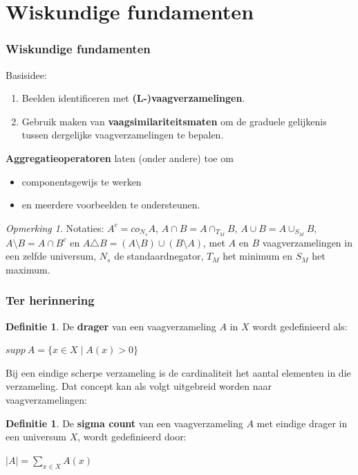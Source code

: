 \documentclass[dutch]{beamer}
\theoremstyle{definition}
\newtheorem{definitie}[theorem]{Definitie}
\theoremstyle{remark}
\newtheorem{opmerking}[theorem]{Opmerking}
\theoremstyle{example}
\begin{document}
\section{Wiskundige fundamenten}
\frame
{
  \frametitle{Wiskundige fundamenten}

  Basisidee:
  \begin{enumerate}
  \item Beelden identificeren met \textbf{(L-)vaagverzamelingen}.
  \item Gebruik maken van \textbf{vaagsimilariteitsmaten} om de graduele 
  gelijkenis tussen dergelijke vaagverzamelingen te bepalen.
  \end{enumerate}
  
  \textbf{Aggregatieoperatoren} laten (onder andere) toe om
  \begin{itemize}
  \item componentsgewijs te werken
  \item en meerdere voorbeelden te ondersteunen.
  \end{itemize}
  
  \begin{opmerking}
  Notaties: $A^c = co_{N_s} A$, $A \cap B = A \cap_{T_M} B$, $A \cup B = A \cup_{S_M} B$,
  $A \setminus B = A \cap B^c$ en $A \triangle B = (A \setminus B) \cup (B \setminus A)$,
  met $A$ en $B$ vaagverzamelingen in een zelfde universum, $N_s$ de standaardnegator, 
  $T_M$ het minimum en $S_M$ het maximum.
  \end{opmerking}
}
\frame
{
  \frametitle{Ter herinnering}
  
  \begin{definitie}
  De \textbf{drager} van een vaagverzameling $A$ in $X$ wordt gedefinieerd als:
  \begin{minipage}{\textwidth}
  \vspace{6pt}
  \centering
  $\displaystyle supp\ A = \{x \in X \mid A(x) > 0\}$
  \end{minipage}
  \end{definitie}
  
  \vspace{10pt}
  Bij een eindige scherpe verzameling is de cardinaliteit het aantal 
  elementen in die verzameling. Dat concept kan als volgt uitgebreid 
  worden naar vaagverzamelingen:
  \begin{definitie}
  De \textbf{sigma count} van een vaagverzameling $A$ met eindige drager in een universum $X$, wordt
  gedefinieerd door:
  \begin{minipage}{\textwidth}
  \vspace{6pt}
  \centering
  $\displaystyle |A|=\sum_{x \in X} A(x)$
  \end{minipage}
  \end{definitie}
}
\end{document}
